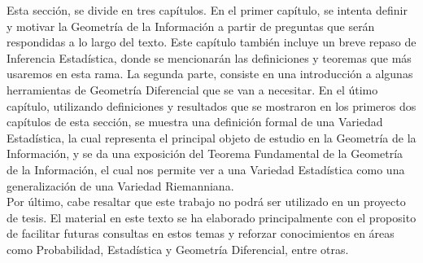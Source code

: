 Esta secci\'on, se divide en tres cap\'itulos. En el primer cap\'itulo, se intenta definir y motivar la Geometr\'ia de la Informaci\'on a partir de preguntas que ser\'an respondidas a lo largo del texto. Este cap\'itulo tambi\'en incluye un breve repaso de Inferencia Estad\'istica, donde se mencionar\'an las definiciones y teoremas que m\'as usaremos en esta rama. La segunda parte, consiste en una introducci\'on a algunas herramientas de Geometr\'ia Diferencial que se van a necesitar. En el \'utimo cap\'itulo, utilizando definiciones y resultados que se mostraron en los primeros dos cap\'itulos de esta secci\'on, se muestra una definici\'on formal de una Variedad Estad\'istica, la cual representa el principal objeto de estudio en la Geometr\'ia de la Informaci\'on, y se da una exposici\'on 
del Teorema Fundamental de la Geometr\'ia de la Informaci\'on, el cual nos permite ver a una Variedad Estad\'istica como una generalizaci\'on de una Variedad 
Riemanniana.
\\

Por \'ultimo, cabe resaltar que este trabajo no podr\'a ser utilizado en un proyecto de tesis. El material en este texto se ha elaborado principalmente con el proposito de facilitar futuras consultas en estos temas y reforzar conocimientos en \'areas como Probabilidad, Estad\'istica y Geometr\'ia Diferencial, entre otras. 